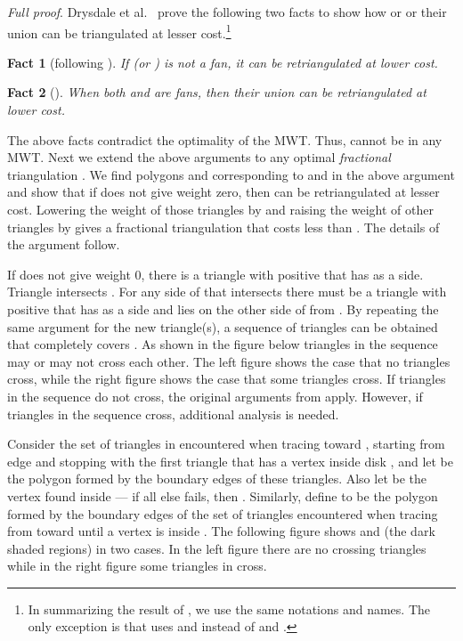 \documentclass[final]{siamltex}
\newcommand{\Picture}[1]{}
\newcommand{\xfigpdf}[1]{\Picture{#1.pdf_t}}
\newcommand{\xfig}[1]{\xfigpdf{#1}}
\newtheorem{fact}{Fact}[theorem]
\newenvironment{fullproof}{\par{\it Full proof}. \ignorespaces}{\endproof}
\begin{document}
\begin{fullproof}
Drysdale et al.~\cite{drysdale2001exclusion} prove the following two facts to show how  or  or 
their union can be triangulated at lesser cost.\footnote
{In summarizing the result of \cite{drysdale2001exclusion}, we use the same notations and names. 
The only exception is that \cite{drysdale2001exclusion} uses  and  instead of  and .}   
\begin{fact}[following {\cite[Lemma 8]{drysdale2001exclusion}}]\label{prop:diamond8}
If  (or ) is not a fan, it can be retriangulated at lower cost. 
\end{fact}

\begin{fact}[{\cite[Lemma 9]{drysdale2001exclusion}}]\label{prop:diamond9}
When both  and  are fans, then their union can be retriangulated at lower cost.
\end{fact}

The above facts contradict the optimality of the MWT. Thus,  cannot be in any MWT.
Next we extend the above arguments to any optimal {\em fractional} triangulation .
We find polygons  and  corresponding to  and  in the above argument and show that if  does not give 
 weight zero, then  can be retriangulated at lesser cost. Lowering the weight of those
triangles by  and raising the weight of other triangles by  gives a fractional triangulation
that costs less than . The details of the argument follow.
 
If  does not give  weight 0, there is a triangle  with positive  
that has  as a side. Triangle  intersects .
For any side  of  that intersects  there must be a triangle  with positive  
that has  as a side and lies on the other side of  from . By repeating the same argument 
for the new triangle(s), a sequence  of triangles can be obtained that completely covers . 
As shown in the figure below triangles in the sequence  may or may not cross each other.
The left figure shows the case that no triangles cross, while the right figure shows the case that some triangles cross. 
If triangles in the sequence do not cross, the original arguments from \cite{drysdale2001exclusion} apply.
However, if triangles in the sequence cross, additional analysis is needed.

\begin{center}
\scalebox{.65}
{
\xfig{sequence}
}
\end{center}
Consider the set of triangles in  
encountered when tracing  toward , starting from edge  and stopping with the 
first triangle that has a vertex inside disk , and let  be the polygon formed by the 
boundary edges of these triangles. Also let
 be the vertex found inside  --- if all else fails, then .
Similarly, define  to be the polygon formed by the boundary edges of the set of triangles encountered 
when tracing  from  toward  until a 
vertex is inside . The following figure shows  and  (the dark shaded regions) in two cases.
In the left figure there are no crossing triangles while in the right figure some triangles in  cross. 
\begin{center}
\scalebox{.7}
{
  \xfig{ABregion}
}
\end{center}



\end{fullproof}
\end{document}
